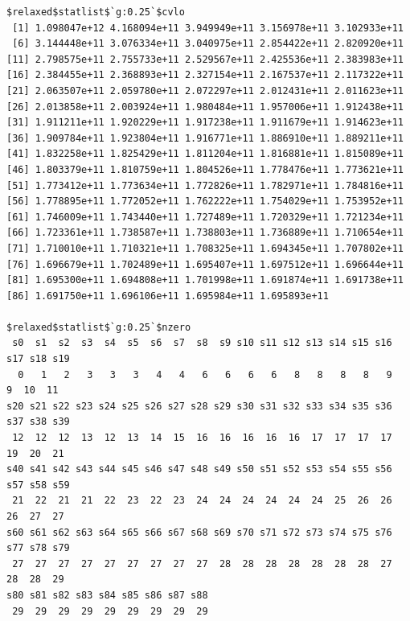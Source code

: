 \documentclass[
]{article}
\begin{document}
\begin{verbatim}
$relaxed$statlist$`g:0.25`$cvlo
 [1] 1.098047e+12 4.168094e+11 3.949949e+11 3.156978e+11 3.102933e+11
 [6] 3.144448e+11 3.076334e+11 3.040975e+11 2.854422e+11 2.820920e+11
[11] 2.798575e+11 2.755733e+11 2.529567e+11 2.425536e+11 2.383983e+11
[16] 2.384455e+11 2.368893e+11 2.327154e+11 2.167537e+11 2.117322e+11
[21] 2.063507e+11 2.059780e+11 2.072297e+11 2.012431e+11 2.011623e+11
[26] 2.013858e+11 2.003924e+11 1.980484e+11 1.957006e+11 1.912438e+11
[31] 1.911211e+11 1.920229e+11 1.917238e+11 1.911679e+11 1.914623e+11
[36] 1.909784e+11 1.923804e+11 1.916771e+11 1.886910e+11 1.889211e+11
[41] 1.832258e+11 1.825429e+11 1.811204e+11 1.816881e+11 1.815089e+11
[46] 1.803379e+11 1.810759e+11 1.804526e+11 1.778476e+11 1.773621e+11
[51] 1.773412e+11 1.773634e+11 1.772826e+11 1.782971e+11 1.784816e+11
[56] 1.778895e+11 1.772052e+11 1.762222e+11 1.754029e+11 1.753952e+11
[61] 1.746009e+11 1.743440e+11 1.727489e+11 1.720329e+11 1.721234e+11
[66] 1.723361e+11 1.738587e+11 1.738803e+11 1.736889e+11 1.710654e+11
[71] 1.710010e+11 1.710321e+11 1.708325e+11 1.694345e+11 1.707802e+11
[76] 1.696679e+11 1.702489e+11 1.695407e+11 1.697512e+11 1.696644e+11
[81] 1.695300e+11 1.694808e+11 1.701998e+11 1.691874e+11 1.691738e+11
[86] 1.691750e+11 1.696106e+11 1.695984e+11 1.695893e+11

$relaxed$statlist$`g:0.25`$nzero
 s0  s1  s2  s3  s4  s5  s6  s7  s8  s9 s10 s11 s12 s13 s14 s15 s16 s17 s18 s19 
  0   1   2   3   3   3   4   4   6   6   6   6   8   8   8   8   9   9  10  11 
s20 s21 s22 s23 s24 s25 s26 s27 s28 s29 s30 s31 s32 s33 s34 s35 s36 s37 s38 s39 
 12  12  12  13  12  13  14  15  16  16  16  16  16  17  17  17  17  19  20  21 
s40 s41 s42 s43 s44 s45 s46 s47 s48 s49 s50 s51 s52 s53 s54 s55 s56 s57 s58 s59 
 21  22  21  21  22  23  22  23  24  24  24  24  24  24  25  26  26  26  27  27 
s60 s61 s62 s63 s64 s65 s66 s67 s68 s69 s70 s71 s72 s73 s74 s75 s76 s77 s78 s79 
 27  27  27  27  27  27  27  27  27  28  28  28  28  28  28  28  27  28  28  29 
s80 s81 s82 s83 s84 s85 s86 s87 s88 
 29  29  29  29  29  29  29  29  29 



\end{verbatim}
\end{document}
